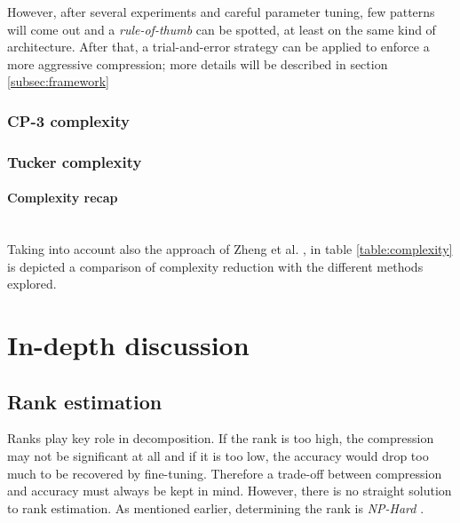 However, after several experiments and careful parameter tuning, few patterns will come out and a \emph{rule-of-thumb} can be spotted, at least on the same kind of architecture. After that, a trial-and-error strategy can be applied to enforce a more aggressive compression; more details will be described in section \ref{subsec:framework}

\subsubsection{CP-3 complexity}


\subsubsection{Tucker complexity} 

\paragraph{Complexity recap}\\
Taking into account also the approach of Zheng et al. \parencite{zhang2015SVD}, in table \ref{table:complexity} is depicted a comparison of complexity reduction with the different methods explored. 



\section{In-depth discussion}

\subsection{Rank estimation}
Ranks play key role in decomposition. If the rank is too high, the compression may not be significant at all and if it is too low, the accuracy would drop too much to be recovered by fine-tuning. Therefore a trade-off between compression and accuracy must always be kept in mind. 
\newline 
However, there is no straight solution to rank estimation. As mentioned earlier, determining the rank is \emph{NP-Hard} \parencite{rank-hard1}\parencite{rank-hard2}\parencite{rank-hard3}. \\
 
